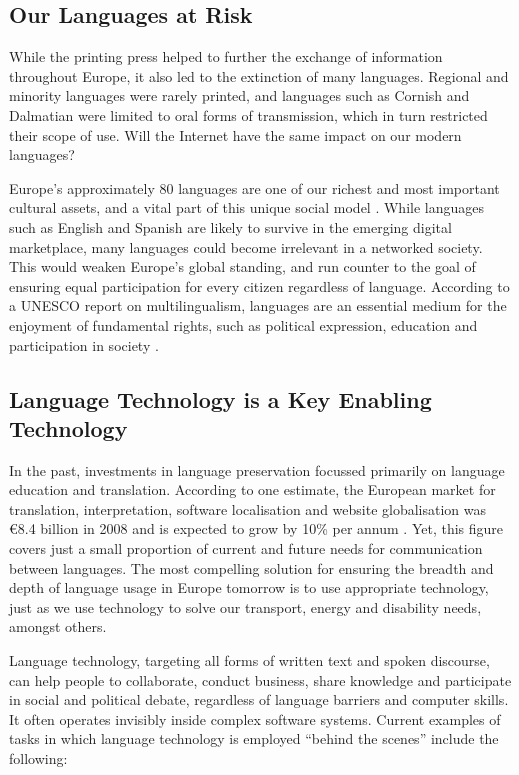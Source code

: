 \begin{multicols}{2}
\subsection{Our Languages at Risk}

While the printing press helped to further the exchange of information throughout Europe, it also led to the extinction of many languages. Regional and minority languages were rarely printed, and languages such as Cornish and Dalmatian were limited to oral forms of transmission, which in turn restricted their scope of use. Will the Internet have the same impact on our modern languages?


Europe’s approximately 80 languages are one of our richest and most important cultural assets, and a vital part of this unique social model \cite{EC2}. While languages such as English and Spanish are likely to survive in the emerging digital marketplace, many languages could become irrelevant in a networked society. This would weaken Europe’s global standing, and run counter to the goal of ensuring equal participation for every citizen regardless of language. According to a UNESCO report on multilingualism, languages are an essential medium for the enjoyment of fundamental rights, such as political expression, education and participation in society \cite{Unesco1}.

\subsection{Language Technology is a Key Enabling Technology}

In the past, investments in language preservation focussed primarily on language education and translation. According to one estimate, the European market for translation, interpretation, software localisation and website globalisation was €8.4 billion in 2008 and is expected to grow by 10\% per annum \cite{EC3}. Yet, this figure covers just a small proportion of current and future needs for communication between languages. The most compelling solution for ensuring the breadth and depth of language usage in Europe tomorrow is to use appropriate technology, just as we use technology to solve our transport, energy and disability needs, amongst others.

Language technology, targeting all forms of written text and spoken discourse, can help people to collaborate, conduct business, share knowledge and participate in social and political debate, regardless of language barriers and computer skills. It often operates invisibly inside complex software systems. Current examples of tasks in which language technology is employed “behind the scenes” include the following:


\end{multicols}
